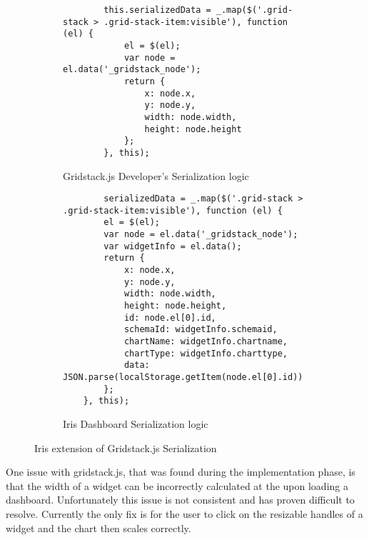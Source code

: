 \documentclass[12pt,a4paper,titlepage]{report}
\begin{document}
\begin{figure}[H]
\centering
\begin{tcolorbox}
    \begin{subfigure}{\textwidth}
        \begin{tcolorbox}
        \centering
        \begin{verbatim}
        this.serializedData = _.map($('.grid-stack > .grid-stack-item:visible'), function (el) {
            el = $(el);
            var node = el.data('_gridstack_node');
            return {
                x: node.x,
                y: node.y,
                width: node.width,
                height: node.height
            };
        }, this);
        \end{verbatim}
        \caption{Gridstack.js Developer's Serialization logic}\label{fig:Serialization_logic}
    \end{tcolorbox}
    \end{subfigure}%
    \newline
    \begin{subfigure}{\textwidth}
        \begin{tcolorbox}
        \centering
        \begin{verbatim}
        serializedData = _.map($('.grid-stack > .grid-stack-item:visible'), function (el) {
        el = $(el);
        var node = el.data('_gridstack_node');
        var widgetInfo = el.data();
        return {
            x: node.x,
            y: node.y,
            width: node.width,
            height: node.height,
            id: node.el[0].id,
            schemaId: widgetInfo.schemaid,
            chartName: widgetInfo.chartname,
            chartType: widgetInfo.charttype,
            data: JSON.parse(localStorage.getItem(node.el[0].id))
        };
    }, this);
        \end{verbatim}
        \caption{Iris Dashboard Serialization logic}
    \end{tcolorbox}
    \end{subfigure}

\end{tcolorbox}
\caption{Iris extension of Gridstack.js Serialization}
\end{figure}

One issue with gridstack.js, that was found during the implementation phase, is that the width of a widget can be incorrectly calculated at the upon loading a dashboard. Unfortunately this issue is not consistent and has proven difficult to resolve. Currently the only fix is for the user to click on the resizable handles of a widget and the chart then scales correctly.
\end{document}
